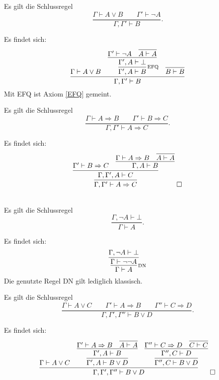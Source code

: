 \begin{Satz}
Es gilt die Schlussregel
\[\dfrac{\Gamma\vdash A\lor B\qquad\Gamma'\vdash \neg A}{\Gamma,\Gamma'\vdash B}.\]
\end{Satz}
\begin{Beweis}
Es findet sich:
\[\infer{\Gamma,\Gamma'\vdash B}{
  \Gamma\vdash A\lor B
  & \infer[\infernote{EFQ}]{\Gamma',A\vdash B}{
      \infer{\Gamma',A\vdash\bot}{
        \Gamma'\vdash\neg A & \infer{A\vdash A}{}}}
  & \infer{B\vdash B}{}}\]
Mit EFQ ist Axiom \ref{EFQ} gemeint.\,\qedsymbol
\end{Beweis}

\begin{Satz}[Kettenschluss]
Es gilt die Schlussregel
\[\dfrac{\Gamma\vdash A\Rightarrow B\qquad\Gamma'\vdash B\Rightarrow C}
{\Gamma,\Gamma'\vdash A\Rightarrow C}.\]
\end{Satz}
\begin{Beweis} Es findet sich:
\[\infer{\Gamma,\Gamma'\vdash A\Rightarrow C}{
  \infer{\Gamma,\Gamma',A\vdash C}{
    \Gamma'\vdash B\Rightarrow C &
      \infer{\Gamma,A\vdash B}{
        \Gamma\vdash A\Rightarrow B
        & \infer{A\vdash A}{}}}}\;\qedsymbol
\]
\end{Beweis}

\begin{Satz}%
 \strong{[LEM]}\\
Es gilt die Schlussregel
\[\dfrac{\Gamma,\neg A\vdash\bot}{\Gamma\vdash A}.\]
\end{Satz}
\begin{Beweis} Es findet sich:
\[\infer[\infernote{DN}]{\Gamma\vdash A}{
  \infer{\Gamma\vdash\neg\neg A}{
    \Gamma,\neg A\vdash\bot}}
\]
Die genutzte Regel DN gilt lediglich klassisch.\,\qedsymbol
\end{Beweis}

\begin{Satz}\label{destructive-dilemma}
Es gilt die Schlussregel
\[\dfrac{\Gamma\vdash A\lor C\qquad
\Gamma'\vdash A\Rightarrow B\qquad\Gamma''\vdash C\Rightarrow D}{
\Gamma,\Gamma',\Gamma''\vdash B\lor D}.\]
\end{Satz}
\begin{Beweis}
Es findet sich:
\[\infer{\Gamma,\Gamma',\Gamma''\vdash B\lor D}{
  \Gamma\vdash A\lor C
  & \infer{\Gamma',A\vdash B\lor D}{
      \infer{\Gamma',A\vdash B}{
        \Gamma'\vdash A\Rightarrow B
        & \infer{A\vdash A}{}}}
  & \infer{\Gamma'',C\vdash B\lor D}{
      \infer{\Gamma'',C\vdash D}{
        \Gamma''\vdash C\Rightarrow D
        & \infer{C\vdash C}{}}}}\;\qedsymbol
\]
\end{Beweis}

